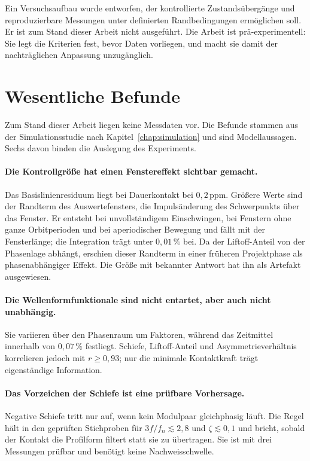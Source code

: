 \documentclass[12pt,a4paper]{report}
\begin{document}
Ein Versuchsaufbau wurde entworfen, der kontrollierte Zustandsübergänge
und reproduzierbare Messungen unter definierten Randbedingungen
ermöglichen soll. Er ist zum Stand dieser Arbeit nicht ausgeführt. Die
Arbeit ist prä-experimentell: Sie legt die Kriterien fest, bevor Daten
vorliegen, und macht sie damit der nachträglichen Anpassung
unzugänglich.

\section{Wesentliche Befunde}
\label{sec:befunde}

Zum Stand dieser Arbeit liegen keine Messdaten vor. Die Befunde stammen
aus der Simulationsstudie nach Kapitel~\ref{chap:simulation} und sind
Modellaussagen. Sechs davon binden die Auslegung des Experiments.

\paragraph{Die Kontrollgröße hat einen Fenstereffekt sichtbar
gemacht.} Das Basislinienresiduum liegt bei Dauerkontakt bei
$0{,}2\,\mathrm{ppm}$. Größere Werte sind der Randterm des
Auswertefensters, die Impulsänderung des Schwerpunkts über das Fenster.
Er entsteht bei unvollständigem Einschwingen, bei Fenstern ohne ganze
Orbitperioden und bei aperiodischer Bewegung und fällt mit der
Fensterlänge; die Integration trägt unter $0{,}01\,\%$ bei. Da der
Liftoff-Anteil von der Phasenlage abhängt, erschien dieser Randterm in
einer früheren Projektphase als phasenabhängiger Effekt. Die Größe mit bekannter Antwort hat ihn als Artefakt
ausgewiesen.

\paragraph{Die Wellenformfunktionale sind nicht entartet, aber auch
nicht unabhängig.} Sie variieren über den Phasenraum um Faktoren,
während das Zeitmittel innerhalb von $0{,}07\,\%$ festliegt. Schiefe,
Liftoff-Anteil und Asymmetrieverhältnis korrelieren jedoch mit
$r \geq 0{,}93$; nur die minimale Kontaktkraft trägt eigenständige
Information.

\paragraph{Das Vorzeichen der Schiefe ist eine prüfbare Vorhersage.}
Negative Schiefe tritt nur auf, wenn kein
Modulpaar gleichphasig läuft. Die Regel hält in den geprüften
Stichproben für $3f/f_n \lesssim 2{,}8$ und $\zeta \lesssim 0{,}1$ und
bricht, sobald der Kontakt die Profilform filtert statt sie zu
übertragen. Sie ist mit drei Messungen prüfbar und benötigt keine
Nachweisschwelle.
\end{document}
